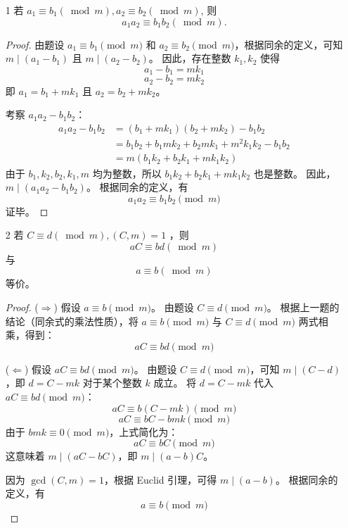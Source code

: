 \begin{enumerate}
    \item[1] 若 $a_1 \equiv b_1(\bmod m), a_2 \equiv b_2(\bmod m)$, 则
    $$
    a_1 a_2 \equiv b_1 b_2(\bmod m) .
    $$

    \begin{proof}
        由题设 $a_1 \equiv b_1 \pmod m$ 和 $a_2 \equiv b_2 \pmod m$，根据同余的定义，可知 $m \mid (a_1 - b_1)$ 且 $m \mid (a_2 - b_2)$。
        因此，存在整数 $k_1, k_2$ 使得
        \[ a_1 - b_1 = mk_1 \]
        \[ a_2 - b_2 = mk_2 \]
        即 $a_1 = b_1 + mk_1$ 且 $a_2 = b_2 + mk_2$。
        
        考察 $a_1 a_2 - b_1 b_2$：
        \begin{align*}
            a_1 a_2 - b_1 b_2 &= (b_1 + mk_1)(b_2 + mk_2) - b_1 b_2 \\
            &= b_1 b_2 + b_1 mk_2 + b_2 mk_1 + m^2 k_1 k_2 - b_1 b_2 \\
            &= m(b_1 k_2 + b_2 k_1 + mk_1 k_2)
        \end{align*}
        由于 $b_1, k_2, b_2, k_1, m$ 均为整数，所以 $b_1 k_2 + b_2 k_1 + mk_1 k_2$ 也是整数。
        因此，$m \mid (a_1 a_2 - b_1 b_2)$。
        根据同余的定义，有
        \[ a_1 a_2 \equiv b_1 b_2 \pmod m \]
        证毕。
    \end{proof}
    
    \item[2] 若 $C \equiv d(\bmod m),(C, m)=1$ ，则
    $$
    a C \equiv b d(\bmod m)
    $$
    与
    $$
    a \equiv b(\bmod m)
    $$
    等价。

    \begin{proof}
        ($\Longrightarrow$) 假设 $a \equiv b \pmod m$。
        由题设 $C \equiv d \pmod m$。
        根据上一题的结论（同余式的乘法性质），将 $a \equiv b \pmod m$ 与 $C \equiv d \pmod m$ 两式相乘，得到：
        \[ a C \equiv b d \pmod m \]
        
        ($\Longleftarrow$) 假设 $a C \equiv b d \pmod m$。
        由题设 $C \equiv d \pmod m$，可知 $m \mid (C-d)$，即 $d = C - mk$ 对于某个整数 $k$ 成立。
        将 $d = C - mk$ 代入 $a C \equiv b d \pmod m$：
        \[ a C \equiv b (C - mk) \pmod m \]
        \[ a C \equiv b C - bmk \pmod m \]
        由于 $bmk \equiv 0 \pmod m$，上式简化为：
        \[ a C \equiv b C \pmod m \]
        这意味着 $m \mid (a C - b C)$，即 $m \mid (a - b) C$。
        
        因为 $\gcd(C, m) = 1$，根据 Euclid 引理，可得 $m \mid (a - b)$。
        根据同余的定义，有
        \[ a \equiv b \pmod m \]
        

\end{proof}
\end{enumerate}
